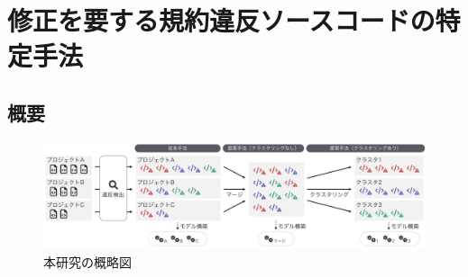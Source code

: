\documentclass[T,J]{fose} %
\begin{document}










\section{修正を要する規約違反ソースコードの特定手法}\label{sec:approach}

\subsection{概要}
\begin{figure}[t]
	\centering
	\includegraphics[width=1.0\linewidth]{Kameoka_fig/kameoka_fig1.pdf}
	\caption{本研究の概略図}
	\label{fig:Teiannsyuhou}
\end{figure}
\end{document}
